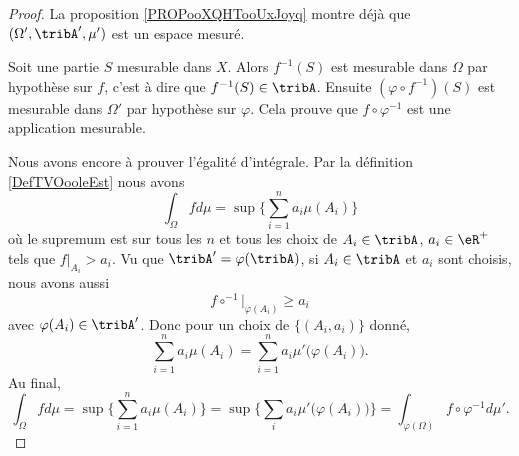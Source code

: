 \begin{proof}
    La proposition \ref{PROPooXQHTooUxJoyq} montre déjà que \( (\Omega',\tribA',\mu')\) est un espace mesuré.

    Soit une partie \( S\) mesurable dans \( X\). Alors \( f^{-1}(S)\) est mesurable dans \( \Omega\) par hypothèse sur \( f\), c'est à dire que \( f^{-1}(S)\in\tribA\). Ensuite \( (\varphi\circ f^{-1})(S)\) est mesurable dans \( \Omega'\) par hypothèse sur \( \varphi\). Cela prouve que \(  f\circ\varphi^{-1} \) est une application mesurable.

    Nous avons encore à prouver l'égalité d'intégrale. Par la définition \ref{DefTVOooleEst} nous avons
    \begin{equation}
        \int_{\Omega}fd\mu=\sup\{ \sum_{i=1}^na_i\mu(A_i) \}
    \end{equation}
    où le supremum est sur tous les \( n\) et tous les choix de \( A_i\in\tribA\), \( a_i\in\eR^+\) tels que \( f|_{A_i}>a_i\). Vu que \( \tribA'=\varphi(\tribA)\), si \( A_i\in \tribA\) et \( a_i\) sont choisis, nous avons aussi 
    \begin{equation}
        f\circ^{-1}|_{\varphi(A_i)}\geq a_i
    \end{equation}
    avec \( \varphi(A_i)\in\tribA'\). Donc pour un choix de \( \{ (A_i,a_i) \}\) donné,
    \begin{equation}
        \sum_{i=1}^na_i\mu(A_i)=\sum_{i=1}^na_i\mu'\big( \varphi(A_i) \big).
    \end{equation}
    Au final,
    \begin{equation}
        \int_{\Omega}fd\mu=\sup\{ \sum_{i=1}^na_i\mu(A_i) \}=\sup\{ \sum_ia_i\mu'\big( \varphi(A_i) \big) \}=\int_{\varphi(\Omega)}f\circ\varphi^{-1}d\mu'.
    \end{equation}
\end{proof}

